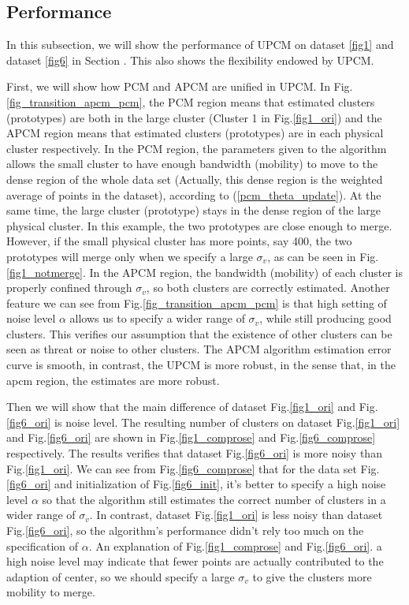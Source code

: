 \documentclass[journal]{IEEEtran}
\begin{document}
\subsection{Performance}
\label{sec-4-2}
In this subsection, we will show the performance of UPCM on dataset \ref{fig1} and dataset \ref{fig6} in Section . This also shows the flexibility endowed by UPCM.

First, we will show how PCM and APCM are unified in UPCM. 
In Fig.\ref{fig_transition_apcm_pcm}, the PCM region means that estimated clusters (prototypes) are both in the large cluster (Cluster 1 in Fig.\ref{fig1_ori}) and the APCM region means that estimated clusters (prototypes) are in each physical cluster respectively.
In the PCM region, the parameters given to the algorithm allows the small cluster to have enough bandwidth (mobility) to move to the dense region of the whole data set (Actually, this dense region is the weighted average of points in the dataset), according to (\ref{pcm_theta_update}). At the same time, the large cluster (prototype) stays in the dense region of the large physical cluster. In this example, the two prototypes are close enough to merge. However, if the small physical cluster has more points, say 400, the two prototypes will merge only when we specify a large $\sigma_v$, as can be seen in Fig.\ref{fig1_notmerge}.
In the APCM region, the bandwidth (mobility) of each cluster is properly confined through $\sigma_v$, so both clusters are correctly estimated.
Another feature we can see from Fig.\ref{fig_transition_apcm_pcm} is that high setting of noise level $\alpha$ allows us to specify a wider range of  $\sigma_v$, while still producing good clusters. This verifies our assumption that the existence of other clusters can be seen as threat or noise to other clusters. 
The APCM algorithm estimation error curve is smooth, in contrast, the UPCM is more robust, in the sense that, in the apcm region, the estimates are more robust.

Then we will show that the main difference of dataset Fig.\ref{fig1_ori} and Fig.\ref{fig6_ori} is noise level.
The resulting number of clusters on dataset Fig.\ref{fig1_ori} and Fig.\ref{fig6_ori} are shown in Fig.\ref{fig1_comprose} and Fig.\ref{fig6_comprose} respectively. The results verifies that dataset Fig.\ref{fig6_ori} is more noisy than Fig.\ref{fig1_ori}. 
We can see from Fig.\ref{fig6_comprose} that for the data set Fig.\ref{fig6_ori} and initialization of Fig.\ref{fig6_init}, it's better to specify a high noise level $\alpha$ so that the algorithm still estimates the correct number of clusters in a wider range of $\sigma_v$. In contrast, dataset Fig.\ref{fig1_ori} is less noisy than dataset Fig.\ref{fig6_ori}, so the algorithm's performance didn't rely too much on the specification of $\alpha$.
An explanation of Fig.\ref{fig1_comprose} and Fig.\ref{fig6_ori}. a high noise level may indicate that fewer points are actually contributed to the adaption of center, so we should specify a large $\sigma_v$ to give the clusters more mobility to merge.
\end{document}

